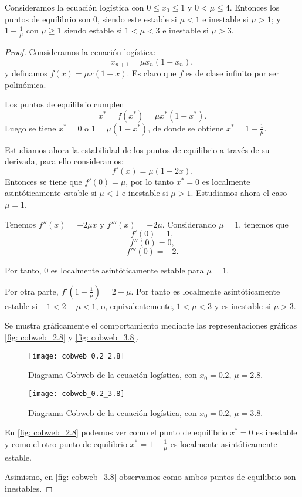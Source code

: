 \begin{proposition}
Consideramos la ecuación logística con $0\leq x_0\leq 1$ y $0< \mu\leq 4$. Entonces los puntos de equilibrio son $0$, siendo este estable si $\mu < 1$ e inestable si $\mu > 1$; y $1-\frac{1}{\mu}$ con $\mu\geq 1$ siendo estable si $1<\mu<3$ e inestable si $\mu > 3$.
\end{proposition}
\begin{proof}
Consideramos la ecuación logística:
$$x_{n+1} = \mu x_n(1-x_n),$$
y definamos $f(x)=\mu x(1-x)$. Es claro que $f$ es de clase infinito por ser polinómica.

Los puntos de equilibrio cumplen
$$x^*=f(x^*)=\mu x^*(1-x^*).$$
Luego se tiene $x^*=0$ o $1=\mu (1-x^*)$, de donde se obtiene $x^*=1-\frac{1}{\mu}$.

Estudiamos ahora la estabilidad de los puntos de equilibrio a través de su derivada, para ello consideramos:
$$f'(x)=\mu (1-2x).$$
Entonces se tiene que $f'(0)=\mu$, por lo tanto $x^*=0$ es localmente asintóticamente estable si $\mu < 1$ e inestable si $\mu > 1$. Estudiamos ahora el caso $\mu = 1$.

Tenemos $f''(x)=-2\mu x$ y $f'''(x)=-2\mu$. Considerando $\mu =1$, tenemos que
$$f'(0)=1,$$
$$f''(0)=0,$$
$$f'''(0)=-2.$$

Por tanto, $0$ es localmente asintóticamente estable para $\mu = 1$.

Por otra parte, $f'\left(1-\frac{1}{\mu}\right) = 2-\mu$. Por tanto es localmente asintóticamente estable si $-1<2-\mu<1$, o, equivalentemente, $1<\mu < 3$ y es inestable si $\mu > 3$.

Se mustra gráficamente el comportamiento mediante las representaciones gráficas \eqref{fig: cobweb_2.8} y \eqref{fig: cobweb_3.8}.

\begin{figure}
\begin{center}
\caption{Diagrama Cobweb de la ecuación logística, con $x_0=0.2$, $\mu=2.8$.}
\label{fig: cobweb_2.8}
\texttt{[image: cobweb\_0.2\_2.8]}
\end{center}
\end{figure}

\begin{figure}
\begin{center}
\caption{Diagrama Cobweb de la ecuación logística, con $x_0=0.2$, $\mu=3.8$.}
\label{fig: cobweb_3.8}
\texttt{[image: cobweb\_0.2\_3.8]}
\end{center}
\end{figure}

En \eqref{fig: cobweb_2.8} podemos ver como el punto de equilibrio $x^*=0$ es inestable y como el otro punto de equilibrio $x^*=1-\frac{1}{\mu}$ es localmente asintóticamente estable.

Asimismo, en \eqref{fig: cobweb_3.8} observamos como ambos puntos de equilibrio son inestables.

\end{proof}

